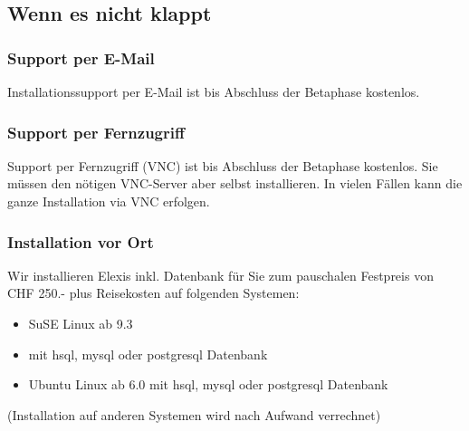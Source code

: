 \subsection{Wenn es nicht klappt}
\subsubsection{Support per E-Mail}
Installationssupport per E-Mail ist bis Abschluss der Betaphase kostenlos.
\subsubsection{Support per Fernzugriff}
Support per Fernzugriff (VNC) ist bis Abschluss der Betaphase kostenlos. Sie müssen den nötigen VNC-Server aber selbst installieren. In vielen Fällen kann die ganze Installation via VNC erfolgen.

\subsubsection{Installation vor Ort}

Wir installieren Elexis inkl. Datenbank für Sie zum pauschalen Festpreis von CHF 250.- plus Reisekosten auf folgenden Systemen:
\begin{itemize}
 \item SuSE Linux ab 9.3
\item mit hsql, mysql oder postgresql Datenbank
\item Ubuntu Linux ab 6.0 mit hsql, mysql oder postgresql Datenbank
\end{itemize}
(Installation auf anderen Systemen wird nach Aufwand verrechnet) 